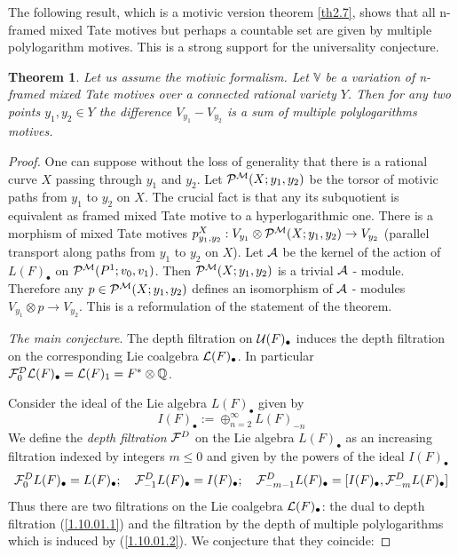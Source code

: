 \documentclass[10pt]{article}
\newtheorem{theorem}{Theorem}[section]
\begin{document}
The following result, which is a motivic version theorem \ref{th2.7}, 
 shows  that all  n-framed mixed Tate motives but perhaps a countable set are 
given by multiple polylogarithm motives. This is a strong support for the universality conjecture. 


\begin{theorem} \label{3.2} Let us assume the motivic formalism. 
Let ${\mathbb V}$ be a variation of n-framed mixed Tate motives over a connected rational variety $Y$. 
Then for any two points $y_1,y_2 \in Y$ the difference $V_{y_1} - V_{y_2}$
is a sum of multiple polylogarithms motives.
\end{theorem}

\begin{proof} One can suppose without the loss of generality that there is a rational curve $X$ passing through $y_1$ and $y_2$. Let ${\cal P}^{{\cal M}}(X; y_1,y_2)$ be the torsor of motivic paths from $y_1$ to $y_2$ on $X$. The crucial fact is that any its subquotient is equivalent as framed mixed Tate motive to a hyperlogarithmic one. There is a morphism of mixed Tate motives $p_{y_1,y_2}^X :V_{y_1}\otimes
 {\cal P}^{{\cal M}}(X;y_1,y_2)
\rightarrow V_{y_2}$ (parallel transport along paths from $y_1$ to $y_2$
on $X$). Let ${\cal A}$ be the kernel of the action of ${L}(F)_{\bullet}$
on   ${\cal P}^{{\cal M}}(P^1; v_0, v_1)$. Then ${\cal P}^{{\cal M}}(X; y_1,y_2)$
  is a trivial  ${\cal A}$ - module. Therefore any $p \in  {\cal P}^{{\cal M}}(X; y_1,y_2)$ defines an isomorphism of ${\cal A}$ - modules $V_{y_1}\otimes p 
\rightarrow V_{y_2}$. This is a reformulation of the statement of the theorem.


{\it The main conjecture}. 
The depth filtration on ${\cal U}(F)_{\bullet}$ induces the depth filtration on the corresponding 
Lie coalgebra 
${\cal L}(F)_{\bullet}$. In particular ${\cal F}_{0}^{\cal D}{\cal L}(F)_{\bullet} = 
{\cal L}(F)_{1} = F^* \otimes {\mathbb Q}$. 

Consider the ideal of the Lie algebra $L(F)_{\bullet}$ given by 
$$
 I(F)_{\bullet}:= \oplus^{\infty}_{n=2}  L(F)_{-n}
$$
We define the {\it depth filtration} ${\cal F}^D$ 
on the Lie algebra $L(F)_{\bullet}$ as an increasing  filtration  
indexed by integers $m \leq 0$ and given by the powers of the ideal $I(F)_{\bullet}$
\begin{equation} \label{1.10.01.1}
{\cal F}^{D}_0L(F)_{\bullet} = L(F)_{\bullet}; \quad 
{\cal F}^{D}_{-1}L(F)_{\bullet} = I(F)_{\bullet} 
; \quad {\cal F}^{D}_{-m-1}L(F)_{\bullet} = [I(F)_{\bullet}, {\cal F}^{D}_{-m}L(F)_{\bullet}]
\end{equation}
Thus there are two filtrations on the Lie coalgebra ${\cal L}(F)_{\bullet}$:  the 
dual to  depth 
filtration (\ref{1.10.01.1}) and the 
filtration  by the depth of multiple polylogarithms which is induced  by (\ref{1.10.01.2}). 
We conjecture that they coincide:
 

\end{proof}
\end{document}
